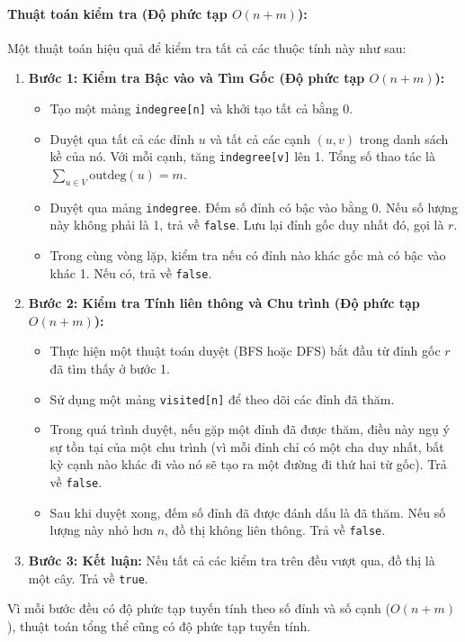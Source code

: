 \documentclass[a4paper,12pt]{article}
\begin{document}
\paragraph{Thuật toán kiểm tra (Độ phức tạp $O(n+m)$):}
Một thuật toán hiệu quả để kiểm tra tất cả các thuộc tính này như sau:
\begin{enumerate}
    \item \textbf{Bước 1: Kiểm tra Bậc vào và Tìm Gốc (Độ phức tạp $O(n+m)$):}
        \begin{itemize}
            \item Tạo một mảng \texttt{indegree[n]} và khởi tạo tất cả bằng 0.
            \item Duyệt qua tất cả các đỉnh $u$ và tất cả các cạnh $(u, v)$ trong danh sách kề của nó. Với mỗi cạnh, tăng \texttt{indegree[v]} lên 1. Tổng số thao tác là $\sum_{u \in V} \text{outdeg}(u) = m$.
            \item Duyệt qua mảng \texttt{indegree}. Đếm số đỉnh có bậc vào bằng 0. Nếu số lượng này không phải là 1, trả về \texttt{false}. Lưu lại đỉnh gốc duy nhất đó, gọi là $r$.
            \item Trong cùng vòng lặp, kiểm tra nếu có đỉnh nào khác gốc mà có bậc vào khác 1. Nếu có, trả về \texttt{false}.
        \end{itemize}
    \item \textbf{Bước 2: Kiểm tra Tính liên thông và Chu trình (Độ phức tạp $O(n+m)$):}
        \begin{itemize}
            \item Thực hiện một thuật toán duyệt (BFS hoặc DFS) bắt đầu từ đỉnh gốc $r$ đã tìm thấy ở bước 1.
            \item Sử dụng một mảng \texttt{visited[n]} để theo dõi các đỉnh đã thăm.
            \item Trong quá trình duyệt, nếu gặp một đỉnh đã được thăm, điều này ngụ ý sự tồn tại của một chu trình (vì mỗi đỉnh chỉ có một cha duy nhất, bất kỳ cạnh nào khác đi vào nó sẽ tạo ra một đường đi thứ hai từ gốc). Trả về \texttt{false}.
            \item Sau khi duyệt xong, đếm số đỉnh đã được đánh dấu là đã thăm. Nếu số lượng này nhỏ hơn $n$, đồ thị không liên thông. Trả về \texttt{false}.
        \end{itemize}
    \item \textbf{Bước 3: Kết luận:} Nếu tất cả các kiểm tra trên đều vượt qua, đồ thị là một cây. Trả về \texttt{true}.
\end{enumerate}
Vì mỗi bước đều có độ phức tạp tuyến tính theo số đỉnh và số cạnh ($O(n+m)$), thuật toán tổng thể cũng có độ phức tạp tuyến tính.
\end{document}
